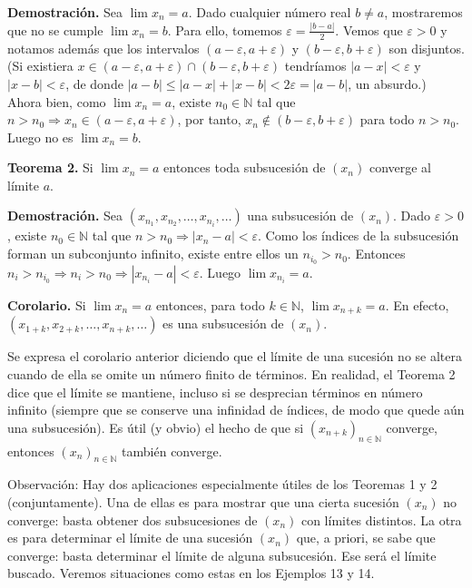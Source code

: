 \documentclass[12pt,oneside]{book}
\begin{document}
\textbf{Demostración.} Sea \(\lim x_n = a\). Dado cualquier número real \(b \neq a\), mostraremos que no se cumple \(\lim x_n = b\). Para ello, tomemos \(\varepsilon = \frac{|b - a|}{2}\). Vemos que \(\varepsilon > 0\) y notamos además que los intervalos \((a - \varepsilon, a + \varepsilon)\) y \((b - \varepsilon, b + \varepsilon)\) son disjuntos. (Si existiera \(x \in (a - \varepsilon, a + \varepsilon) \cap (b - \varepsilon, b + \varepsilon)\) tendríamos \(|a - x| < \varepsilon\) y \(|x - b| < \varepsilon\), de donde \(|a - b| \leq |a - x| + |x - b| < 2\varepsilon = |a - b|\), un absurdo.) Ahora bien, como \(\lim x_n = a\), existe \(n_0 \in \mathbb{N}\) tal que \(n > n_0 \Rightarrow x_n \in (a - \varepsilon, a + \varepsilon)\), por tanto, \(x_n \notin (b - \varepsilon, b + \varepsilon)\) para todo \(n > n_0\). Luego no es \(\lim x_n = b\).

\textbf{Teorema 2.} Si \(\lim x_n = a\) entonces toda subsucesión de \((x_n)\) converge al límite \(a\).

\textbf{Demostración.} Sea \((x_{n_1}, x_{n_2}, \dots, x_{n_i}, \dots)\) una subsucesión de \((x_n)\). Dado \(\varepsilon > 0\), existe \(n_0 \in \mathbb{N}\) tal que \(n > n_0 \Rightarrow |x_n - a| < \varepsilon\). Como los índices de la subsucesión forman un subconjunto infinito, existe entre ellos un \(n_{i_0} > n_0\). Entonces \(n_{i} > n_{i_0} \Rightarrow n_i > n_0 \Rightarrow |x_{n_i} - a| < \varepsilon\). Luego \(\lim x_{n_i} = a\).

\textbf{Corolario.} Si \(\lim x_n = a\) entonces, para todo \(k \in \mathbb{N}\), \(\lim x_{n+k} = a\). En efecto, \((x_{1+k}, x_{2+k}, \dots, x_{n+k}, \dots)\) es una subsucesión de \((x_n)\).

Se expresa el corolario anterior diciendo que el límite de una sucesión no se altera cuando de ella se omite un número finito de términos. En realidad, el Teorema 2 dice que el límite se mantiene, incluso si se desprecian términos en número infinito (siempre que se conserve una infinidad de índices, de modo que quede aún una subsucesión). Es útil (y obvio) el hecho de que si \((x_{n+k})_{n \in \mathbb{N}}\) converge, entonces \((x_n)_{n \in \mathbb{N}}\) también converge.

Observación: Hay dos aplicaciones especialmente útiles de los Teoremas 1 y 2 (conjuntamente). Una de ellas es para mostrar que una cierta sucesión \((x_n)\) no converge: basta obtener dos subsucesiones de \((x_n)\) con límites distintos. La otra es para determinar el límite de una sucesión \((x_n)\) que, a priori, se sabe que converge: basta determinar el límite de alguna subsucesión. Ese será el límite buscado. Veremos situaciones como estas en los Ejemplos 13 y 14.
\end{document}
